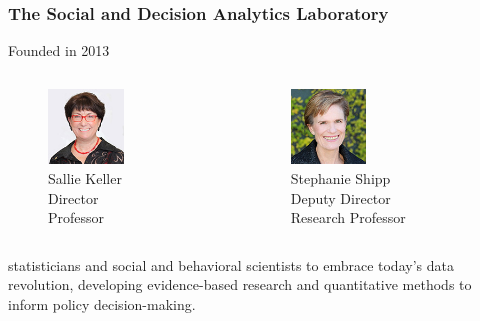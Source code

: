 \documentclass[compress]{beamer}
\begin{document}
    \begin{frame}[Basic2] \frametitle{The Social and Decision Analytics Laboratory}
        Founded in 2013
        \vspace{3mm}

        \begin{columns}
            \begin{column}{0.5\textwidth}
                \begin{figure}
                    \centering
                    \includegraphics[width=2cm]{../figures/keller-sallie-140-w}
                    \caption{Sallie Keller\\Director\\Professor}
                    \label{fig:keller-sallie-140-w}
                \end{figure}
            \end{column}
            \begin{column}{0.5\textwidth}  %
                \begin{figure}
                    \centering
                    \includegraphics[width=2cm]{../figures/shipp-stephanie-140-w}
                        \caption{Stephanie Shipp\\Deputy Director\\Research Professor}
                    \label{fig:shipp-stephanie-140-w}
                \end{figure}
            \end{column}
        \end{columns}

        \begin{displayquote}
        statisticians and social and behavioral scientists to embrace today’s data revolution, developing evidence-based research and quantitative methods to inform policy decision-making.
        \end{displayquote}
    \end{frame}
\end{document}
